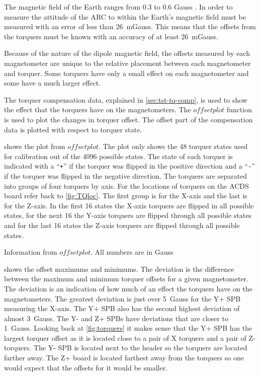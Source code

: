 The magnetic field of the Earth ranges from 0.3 to 0.6 Gauss \cite[pp.~114]{Wertz}. In order to measure the attitude of the \ac{ARC} to within {\textdegree} the Earth's magnetic field must be measured with an error of less than 26~mGauss. This means that the offsets from the torquers must be known with an accuracy of at least 26~mGauss.

Because of the nature of the dipole magnetic field, the offsets measured by each magnetometer are unique to the relative placement between each magnetometer and torquer. Some torquers have only a small effect on each magnetometer and some have a much larger effect. 

The torquer compensation data, explained in \cref{sec:tst-tq-comp}, is used to show the effect that the torquers have on the magnetometers. The \lstMat$offsetplot$ function is used to plot the changes in torquer offset. The offset part of the compensation data is plotted with respect to torquer state.

 shows the plot from \lstMat$offsetplot$. The plot only shows the 48 torquer states used for calibration out of the 4096 possible states. The state of each torquer is indicated with a \enquote{\texttt{+}} if the torquer was flipped in the positive direction and a \enquote{\texttt{-}} if the torquer was flipped in the negative direction. The torquers are separated into groups of four torquers by axis. For the locations of torquers on the \ac{ACDS} board refer back to \cref{fig:TQloc}. The first group is for the X-axis and the last is for the Z-axis. In the first 16 states the X-axis torquers are flipped in all possible states, for the next 16 the Y-axis torquers are flipped through all possible states and for the last 16 states the Z-axis torquers are flipped through all possible states.

 
\begin{table}[!ht]
    \centering
    \caption{Information from \lstMat$offsetplot$. All numbers are in Gauss}
    \label{tab:off-stat}
    
\end{table}

 shows the offset maximums and minimums. The deviation is the difference between the maximum and minimum torquer offsets for a given magnetometer. The deviation is an indication of how much of an effect the torquers have on the magnetometers. The greatest deviation is just over 5~Gauss for the Y+ \ac{SPB} measuring the X-axis. The Y+ \ac{SPB} also has the second highest deviation of almost 3~Gauss. The Y- and Z+ \acp{SPB} have deviations that are closer to 1~Gauss. Looking back at \cref{fig:torquers} it makes sense that the Y+ \ac{SPB} has the largest torquer offset as it is located close to a pair of X torquers and a pair of Z-torquers. The Y- \ac{SPB} is located next to the header so the torquers are located farther away. The Z+ board is located farthest away from the torquers so one would expect that the offsets for it would be smaller.


